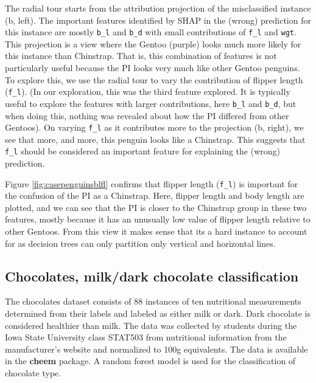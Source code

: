 \documentclass[
]{article}
\begin{document}
The radial tour starts from the attribution projection of the misclassified instance (b, left). The important features identified by SHAP in the (wrong) prediction for this instance are mostly \texttt{b\_l} and \texttt{b\_d} with small contributions of \texttt{f\_l} and \texttt{wgt}. This projection is a view where the Gentoo (purple) looks much more likely for this instance than Chinstrap. That is, this combination of features is not particularly useful because the PI looks very much like other Gentoo penguins. To explore this, we use the radial tour to vary the contribution of flipper length (\texttt{f\_l}). (In our exploration, this was the third feature explored. It is typically useful to explore the features with larger contributions, here \texttt{b\_l} and \texttt{b\_d}, but when doing this, nothing was revealed about how the PI differed from other Gentoos). On varying \texttt{f\_l} as it contributes more to the projection (b, right), we see that more, and more, this penguin looks like a Chinstrap. This suggests that \texttt{f\_l} should be considered an important feature for explaining the (wrong) prediction.

Figure \ref{fig:casepenguinsblfl} confirms that flipper length (\texttt{f\_l}) is important for the confusion of the PI as a Chinstrap. Here, flipper length and body length are plotted, and we can see that the PI is closer to the Chinstrap group in these two features, mostly because it has an unusually low value of flipper length relative to other Gentoos. From this view it makes sense that its a hard instance to account for as decision trees can only partition only vertical and horizontal lines.

\hypertarget{chocolates-milkdark-chocolate-classification}{%
\subsection{Chocolates, milk/dark chocolate classification}\label{chocolates-milkdark-chocolate-classification}}

The chocolates dataset consists of 88 instances of ten nutritional measurements determined from their labels and labeled as either milk or dark. Dark chocolate is considered healthier than milk. The data was collected by students during the Iowa State University class STAT503 from nutritional information from the manufacturer's website and normalized to 100g equivalents. The data is available in the \textbf{cheem} package. A random forest model is used for the classification of chocolate type.
\end{document}
